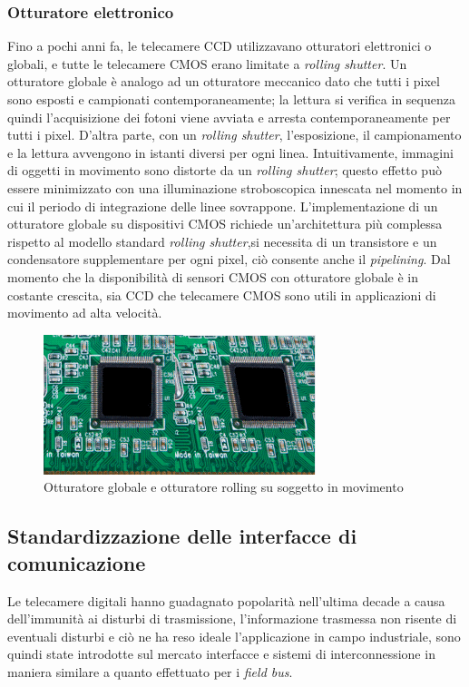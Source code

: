 \subsubsection{Otturatore elettronico}
Fino a pochi anni fa, le telecamere CCD utilizzavano otturatori elettronici o globali, e tutte le telecamere CMOS erano limitate a \emph{rolling shutter}. Un otturatore globale è analogo ad un otturatore meccanico dato che tutti i pixel sono esposti e campionati contemporaneamente; la lettura si verifica in sequenza quindi l'acquisizione dei fotoni viene avviata e arresta contemporaneamente per tutti i pixel. D'altra parte, con un \emph{rolling shutter}, l'esposizione, il campionamento e la lettura avvengono  in istanti diversi per ogni linea. Intuitivamente, immagini di oggetti in movimento sono distorte da un \emph{rolling shutter}; questo effetto può essere minimizzato con una illuminazione stroboscopica innescata nel momento in cui il periodo di integrazione delle linee sovrappone. L'implementazione di un otturatore globale su dispositivi CMOS richiede un'architettura più complessa rispetto al modello standard \emph{rolling shutter},si necessita di un transistore e un condensatore supplementare per ogni pixel, ciò consente anche il \emph{pipelining}.
Dal momento che la disponibilità di sensori CMOS con otturatore globale è in costante crescita, sia CCD che telecamere CMOS sono utili in applicazioni di movimento ad alta velocità.

\begin{figure}[!ht]
\centering
\includegraphics[width=.4\textwidth]{img/global-rolling.png}
\caption{Otturatore globale e otturatore rolling su soggetto in movimento}
\label{fig:global-rolling}
\end{figure}

\subsection{Standardizzazione delle interfacce di comunicazione}
Le telecamere digitali hanno guadagnato popolarità nell'ultima decade a causa dell'immunità ai disturbi di
trasmissione, l'informazione trasmessa non risente di eventuali disturbi e ciò ne ha reso ideale
l'applicazione in campo industriale, sono quindi state introdotte sul mercato interfacce e sistemi di
interconnessione in maniera similare a quanto effettuato per i \emph{field bus}.

